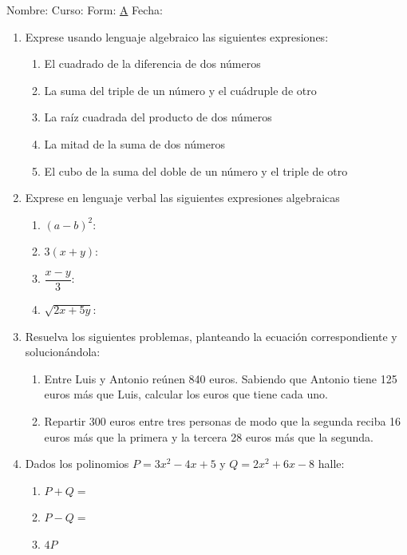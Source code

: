 \documentclass[letterpaper,fleqn]{article}
\newcommand{\LineaNombre}{%
\par
\vspace{\baselineskip}
Nombre:\hrulefill \; Curso: \underline{\hspace*{48pt}} \; Form: \underline{A} \; Fecha: \underline{\hspace*{2.5cm}} \relax
\par}
\begin{document}
\LineaNombre
\begin{enumerate}
 \item Exprese usando lenguaje algebraico las siguientes expresiones:
 \begin{enumerate}
  \item El cuadrado de la diferencia de dos números 
  \item La suma del triple de un número y el cuádruple de otro 
  \item La raíz cuadrada del producto de dos números
  \item La mitad de la suma de dos números 
  \item El cubo de la suma del doble de un número y el triple de otro 
 \end{enumerate}
\item Exprese en lenguaje verbal las siguientes expresiones algebraicas
\begin{enumerate}
 \item $(a-b)^{2}$:
 \item $3(x+y)$: 
 \item $\dfrac{x-y}{3}$:
 \item $\sqrt{2x+5y}$:
\end{enumerate}
\item Resuelva los siguientes problemas, planteando la ecuación correspondiente y solucionándola:
\begin{enumerate}
 \item  Entre Luis y Antonio reúnen 840 euros. Sabiendo que Antonio tiene 125 euros más que Luis, calcular los euros que tiene cada uno. 
  \item Repartir 300 euros entre tres personas de modo que la segunda reciba 16 euros más que la primera y la tercera 28 euros más que la segunda. 
\end{enumerate}
\item Dados los polinomios $P=3x^{2}-4x+5$ y $Q=2x^{2}+6x-8$ halle:
\begin{enumerate}
 \item $P+Q=$
 \item $P-Q=$
 \item $4P$

\end{enumerate}
\end{enumerate}
\end{document}
